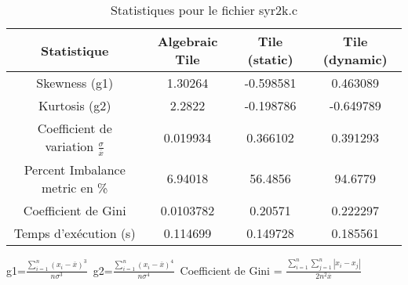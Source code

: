 \documentclass{article}
\begin{document}
\begin{table}[htbp]
  \centering
  \caption{Statistiques pour le fichier syr2k.c}
  \begin{tabular}{|c|c|c|c|}
    \hline
    Statistique & Algebraic Tile & Tile (static) & Tile (dynamic) \\ 
    \hline
    Skewness (g1)  & 1.30264 & -0.598581 & 0.463089 \\ 
    Kurtosis (g2)  & 2.2822 & -0.198786 & -0.649789 \\ 
    Coefficient de variation $ \frac{\sigma}{\overline{x}} $ & 0.019934 & 0.366102 & 0.391293\\ 
    Percent Imbalance metric en \% & 6.94018 & 56.4856 & 94.6779\\ 
    Coefficient de Gini  & 0.0103782 & 0.20571 & 0.222297\\ 
    Temps d'exécution (s) &  0.114699    &  0.149728   &  0.185561   \\ 

    \hline
  \end{tabular}
\end{table}
g1=$ \frac{\sum_{i=1}^{n} (x_i - \overline{x})^3}{n\sigma^3} $\
g2=$ \frac{\sum_{i=1}^{n} (x_i - \overline{x})^4}{n\sigma^4} $\
Coefficient de Gini = $ \frac{\sum_{i=1}^{n}\sum_{j=1}^{n} |x_i - x_j|}{2n^2\overline{x}} $\
\newpage
\end{document}
